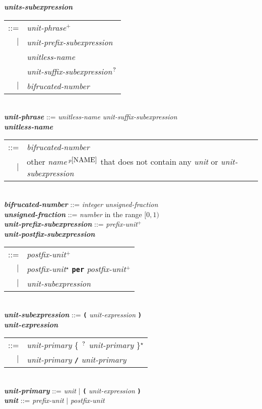 \documentclass[12pt]{article}
\newcommand{\TT}[1]{{\tt \bfseries #1}}
\newcommand{\emkey}[1]{{\em \bfseries #1}}
\newcommand{\pagnote}[1]{$\,^{p\pageref{#1}}$}
\newcommand{\STAR}{{\Large $^\star$}}
\newcommand{\PLUS}[1][]{{$^{+#1}$}}
\newcommand{\QMARK}{{$^{\,\mbox{\footnotesize ?}}$}}
\newenvironment{indpar}[1][0.3in]%
	{\begin{list}{}%
		     {\setlength{\itemsep}{0in}%
		      \setlength{\topsep}{0in}%
		      \setlength{\parsep}{1ex}%
		      \setlength{\labelwidth}{#1}%
		      \setlength{\leftmargin}{#1}%
		      \addtolength{\leftmargin}{\labelsep}}%
	 \item}%
	{\end{list}}
\begin{document}
\begin{indpar}
\emkey{units-subexpression}
    \begin{tabular}[t]{@{}rl}
    ::= & {\em unit-phrase}\PLUS{} \\
    $|$ & {\em unit-prefix-subexpression} \\
        & {\em unitless-name} \\
        & {\em unit-suffix-subexpression}\QMARK{} \\
    $|$ & {\em bifrucated-number} \\
    \end{tabular}
\\[1ex]
\emkey{unit-phrase} ::= {\em unitless-name} {\em unit-suffix-subexpression}
\\[1ex]
\emkey{unitless-name}
    \begin{tabular}[t]{@{}rl}
    ::= & {\em bifrucated-number} \\
    $|$ & other {\em name}\pagnote{NAME} that does not contain
			  any {\em unit} or {\em unit-subexpression}
    \end{tabular}
\\[1ex]
\emkey{bifrucated-number} ::= {\em integer} {\em unsigned-fraction}
\\[1ex]
\emkey{unsigned-fraction} ::= {\em number} in the range $[0,1)$
\\[1ex]
\emkey{unit-prefix-subexpression} ::= {\em prefix-unit}\PLUS{}
\\[1ex]
\emkey{unit-postfix-subexpression}
    \begin{tabular}[t]{@{}r@{~}l}
    ::= & {\em postfix-unit}\PLUS{} \\
    $|$ & {\em postfix-unit}\STAR{} \TT{per} {\em postfix-unit}\PLUS{} \\
    $|$ & {\em unit-subexpression}
    \end{tabular}
\\[1ex]
\emkey{unit-subexpression} ::= \TT{(} {\em unit-expression} \TT{)}
\\[1ex]
\emkey{unit-expression}
    \begin{tabular}[t]{@{}r@{~}l}
    ::= & {\em unit-primary} \{ \TT{*}\QMARK{} {\em unit-primary} \}\STAR{} \\
    $|$ & {\em unit-primary} \TT{/} {\em unit-primary}
    \end{tabular}
\\[1ex]
\emkey{unit-primary}
    ::= {\em unit} $|$ \TT{(} {\em unit-expression} \TT{)}
\\[1ex]
\emkey{unit}
    ::= {\em prefix-unit} $|$ {\em postfix-unit}
\end{indpar}
\end{document}
